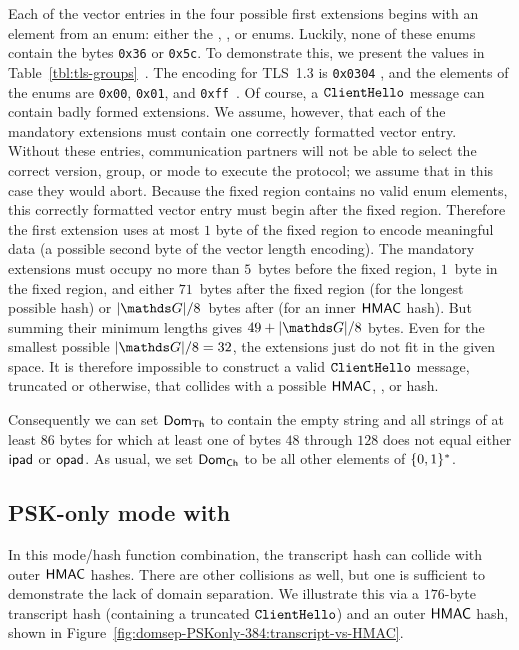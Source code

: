 Each of the vector entries in the four possible first extensions begins with an element from an enum: either the , , or  enums. 
Luckily, none of these enums contain the bytes \texttt{0x36} or \texttt{0x5c}. To demonstrate this, we present the  values in Table~\ref{tbl:tls-groups}~\cite[Section 4.2.7]{rfc8446}. The  encoding for TLS~1.3 is \texttt{0x0304} \cite[Section 4.2.1]{rfc8446}, and the elements of the  enums are \texttt{0x00}, \texttt{0x01}, and \texttt{0xff}~\cite[Section 4.2.9]{rfc8446}. 
Of course, a $\mathtt{ClientHello}$ message can contain badly formed extensions. 
We assume, however, that each of the mandatory extensions must contain one correctly formatted vector entry. 
Without these entries, communication partners will not be able to select the correct version, group, or mode to execute the protocol; we assume that in this case they would abort. 
Because the fixed region contains no valid enum elements, this correctly formatted vector entry must begin after the fixed region. 
Therefore the first extension uses at most $1$ byte of the fixed region to encode meaningful data (a possible second byte of the vector length encoding). 
The mandatory extensions must occupy no more than $5$~bytes before the fixed region, $1$~byte in the fixed region, and either $71$~bytes after the fixed region (for the longest possible  hash) or $|\G|/8$~bytes after (for an inner $\mathsf{HMAC}$ hash). But summing their minimum lengths gives $49+|\G|/8$ bytes. Even for the smallest possible $|\G|/8 = 32$, the extensions just do not fit in the given space.
It is therefore impossible to construct a valid $\mathtt{ClientHello}$ message, truncated or otherwise, that collides with a possible $\mathsf{HMAC}$, , or  hash. 

Consequently we can set $\mathsf{Dom}_{\mathsf{Th}}$ to contain the empty string and all strings of at least $86$ bytes for which at least one of bytes $48$ through $128$ does not equal either $\mathsf{ipad}$ or $\mathsf{opad}$. As usual, we set $\mathsf{Dom}_{\mathsf{Ch}}$ to be all other elements of $\{0,1\}^*$. 


\subsection{PSK-only mode with }

In this mode/hash function combination, the transcript hash can collide with outer $\mathsf{HMAC}$ hashes.
There are other collisions as well, but one is sufficient to demonstrate the lack of domain separation.
We illustrate this via a $176$-byte transcript hash (containing a truncated $\mathtt{ClientHello}$) and an outer $\mathsf{HMAC}$ hash, shown in Figure~\ref{fig:domsep-PSKonly-384:transcript-vs-HMAC}.

